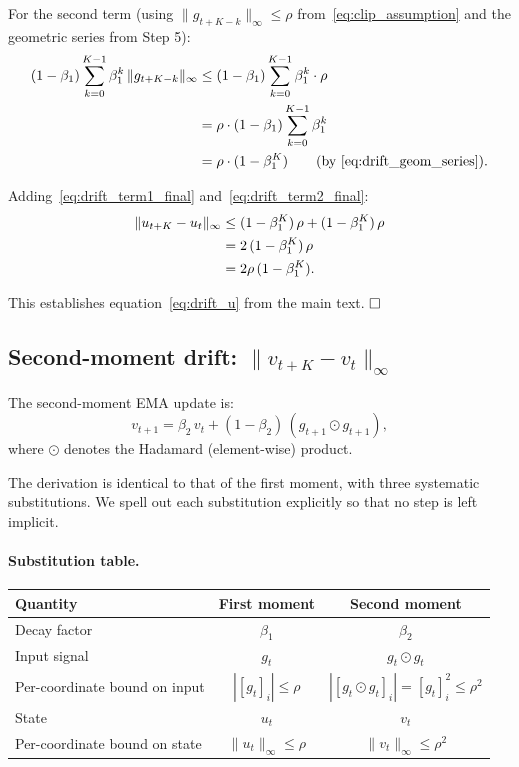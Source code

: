 \documentclass{article}
\begin{document}
For the second term (using $\|g_{t+K-k}\|_\infty \leq \rho$
from~\eqref{eq:clip_assumption} and the geometric series from Step 5):
\begin{align}
(1-\beta_1)\sum_{k=0}^{K-1}\beta_1^k\,\|g_{t+K-k}\|_\infty
&\leq (1-\beta_1)\sum_{k=0}^{K-1}\beta_1^k\cdot\rho
\notag \\
&= \rho\cdot(1-\beta_1)\sum_{k=0}^{K-1}\beta_1^k
\notag \\
&= \rho\cdot(1-\beta_1^K)
\qquad\text{(by~\eqref{eq:drift_geom_series})}.
\label{eq:drift_term2_final}
\end{align}

Adding~\eqref{eq:drift_term1_final} and~\eqref{eq:drift_term2_final}:
\begin{align}
\|u_{t+K} - u_t\|_\infty
&\leq (1-\beta_1^K)\,\rho + (1-\beta_1^K)\,\rho
\notag \\
&= 2\,(1-\beta_1^K)\,\rho
\notag \\
&= 2\rho\,(1-\beta_1^K).
\label{eq:drift_u_qed}
\end{align}

This establishes equation~\eqref{eq:drift_u} from the main text. $\hfill\square$

\subsection{Second-moment drift: $\|v_{t+K} - v_t\|_\infty$}
\label{sec:drift_second}

The second-moment EMA update is:
\begin{equation}
v_{t+1} = \beta_2\,v_t + (1-\beta_2)\,(g_{t+1} \odot g_{t+1}),
\label{eq:drift_v_ema}
\end{equation}
where $\odot$ denotes the Hadamard (element-wise) product.

The derivation is identical to that of the first moment, with three
systematic substitutions. We spell out each substitution explicitly so
that no step is left implicit.

\paragraph{Substitution table.}
\begin{center}
\begin{tabular}{lcc}
\toprule
\textbf{Quantity} & \textbf{First moment} & \textbf{Second moment} \\
\midrule
Decay factor & $\beta_1$ & $\beta_2$ \\
Input signal & $g_t$ & $g_t \odot g_t$ \\
Per-coordinate bound on input & $|[g_t]_i| \leq \rho$ & $|[g_t \odot g_t]_i| = [g_t]_i^2 \leq \rho^2$ \\
State & $u_t$ & $v_t$ \\
Per-coordinate bound on state & $\|u_t\|_\infty \leq \rho$ & $\|v_t\|_\infty \leq \rho^2$ \\
\bottomrule
\end{tabular}
\end{center}
\end{document}
